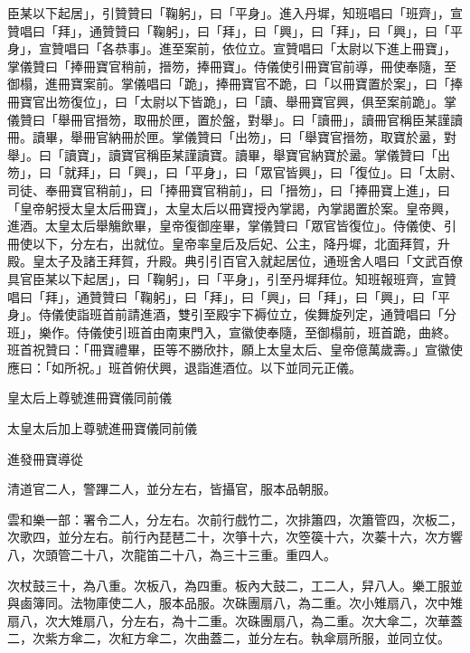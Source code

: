 \begin{pinyinscope}
 臣某以下起居」，引贊贊曰「鞠躬」，曰「平身」。進入丹墀，知班唱曰「班齊」，宣贊唱曰「拜」，通贊贊曰「鞠躬」，曰「拜」，曰「興」，曰「拜」，曰「興」，曰「平身」，宣贊唱曰「各恭事」。進至案前，依位立。宣贊唱曰「太尉以下進上冊寶」，掌儀贊曰「捧冊寶官稍前，搢笏，捧冊寶」。侍儀使引冊寶官前導，冊使奉隨，至御榻，進冊寶案前。掌儀唱曰「跪」，捧冊寶官不跪，曰「以冊寶置於案」，曰「捧冊寶官出笏復位」，曰「太尉以下皆跪」，曰「讀、舉冊寶官興，俱至案前跪」。掌儀贊曰「舉冊官搢笏，取冊於匣，置於盤，對舉」。曰「讀冊」，讀冊官稱臣某謹讀冊。讀畢，舉冊官納冊於匣。掌儀贊曰「出笏」，曰「舉寶官搢笏，取寶於盝，對舉」。曰「讀寶」，讀寶官稱臣某謹讀寶。讀畢，舉寶官納寶於盝。掌儀贊曰「出笏」，曰「就拜」，曰「興」，曰「平身」，曰「眾官皆興」，曰「復位」。曰「太尉、司徒、奉冊寶官稍前」，曰「捧冊寶官稍前」，曰「搢笏」，曰「捧冊寶上進」，曰「皇帝躬授太皇太后冊寶」，太皇太后以冊寶授內掌謁，內掌謁置於案。皇帝興，進酒。太皇太后舉觴飲畢，皇帝復御座畢，掌儀贊曰「眾官皆復位」。侍儀使、引冊使以下，分左右，出就位。皇帝率皇后及后妃、公主，降丹墀，北面拜賀，升殿。皇太子及諸王拜賀，升殿。典引引百官入就起居位，通班舍人唱曰「文武百僚具官臣某以下起居」，曰「鞠躬」，曰「平身」，引至丹墀拜位。知班報班齊，宣贊唱曰「拜」，通贊贊曰「鞠躬」，曰「拜」，曰「興」，曰「拜」，曰「興」，曰「平身」。侍儀使詣班首前請進酒，雙引至殿宇下褥位立，俟舞旋列定，通贊唱曰「分班」，樂作。侍儀使引班首由南東門入，宣徽使奉隨，至御榻前，班首跪，曲終。班首祝贊曰：「冊寶禮畢，臣等不勝欣抃，願上太皇太后、皇帝億萬歲壽。」宣徽使應曰：「如所祝。」班首俯伏興，退詣進酒位。以下並同元正儀。



 皇太后上尊號進冊寶儀同前儀



 太皇太后加上尊號進冊寶儀同前儀



 進發冊寶導從



 清道官二人，警蹕二人，並分左右，皆攝官，服本品朝服。



 雲和樂一部：署令二人，分左右。次前行戲竹二，次排簫四，次簫管四，次板二，次歌四，並分左右。前行內琵琶二十，次箏十六，次箜篌十六，次蓁十六，次方響八，次頭管二十八，次龍笛二十八，為三十三重。重四人。



 次杖鼓三十，為八重。次板八，為四重。板內大鼓二，工二人，舁八人。樂工服並與鹵簿同。法物庫使二人，服本品服。次硃團扇八，為二重。次小雉扇八，次中雉扇八，次大雉扇八，分左右，為十二重。次硃團扇八，為二重。次大傘二，次華蓋二，次紫方傘二，次紅方傘二，次曲蓋二，並分左右。執傘扇所服，並同立仗。




\end{pinyinscope}
